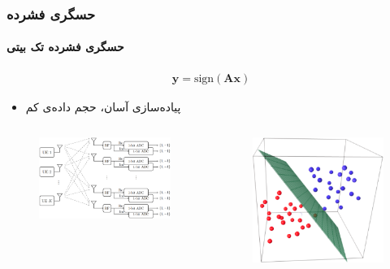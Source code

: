 \begin{frame}
\frametitle{حسگری فشرده}
\framesubtitle{حسگری فشرده تک بیتی}
\begin{small}
\begin{align}
\label{eq6}
\bm{y}= \text{sign}\left(\bm{A}\bm{x}\right)
\end{align}
\end{small}
\begin{itemize}
\item{
پیاده‌سازی آسان، حجم داده‌ی کم
}
\end{itemize}
\pause
\begin{columns}
\begin{figure}
	\centering
	\includegraphics[scale=0.1]{Images/App_fig1.eps}
\end{figure}
\begin{figure}
	\centering
	\includegraphics[scale=0.15]{Images/App_fig2.eps}

\end{figure}
\end{columns}
\end{frame}
